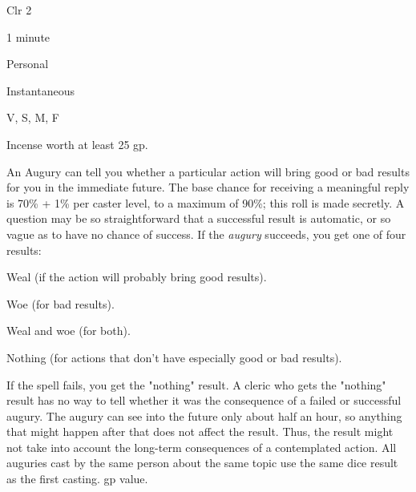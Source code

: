 
\begin{description*}
\item[Level:] Clr 2
\item[Casting Time:] 1 minute
\item[Range:] Personal
\item[Duration:] Instantaneous
\item[Components:] V, S, M, F
\item[Arcane Material Component:] Incense worth at least 25 gp.
\end{description*}

An Augury can tell you whether a particular action will bring good or
bad results for you in the immediate future.
The base chance for receiving a meaningful reply is 70\% + 1\% per caster level,
to a maximum of 90\%; this roll is made secretly. A question may be so straightforward
that a successful result is automatic, or so vague as to have no chance of success.
If the \textit{augury} succeeds, you get one of four results:
\begin{itemize*}
\item Weal (if the action will probably bring good results).
\item Woe (for bad results).
\item Weal and woe (for both).
\item Nothing (for actions that don't have especially good or bad results).
\end{itemize*}
If the spell fails, you get the "nothing" result. A cleric who gets the "nothing"
result has no way to tell whether it was the consequence of a failed or successful
augury.
The augury can see into the future only about half an hour, so anything
that might happen after that does not affect the result. Thus, the result might
not take into account the long-term consequences of a contemplated action. All
auguries cast by the same person about the same topic use the same dice
result as the first casting.
gp value.
